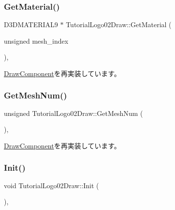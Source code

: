 \subsubsection{\texorpdfstring{Get\+Material()}{GetMaterial()}}
{\footnotesize\ttfamily D3\+D\+M\+A\+T\+E\+R\+I\+A\+L9 $\ast$ Tutorial\+Logo02\+Draw\+::\+Get\+Material (\begin{DoxyParamCaption}\item[{unsigned}]{mesh\+\_\+index }\end{DoxyParamCaption})\hspace{0.3cm}{\ttfamily [override]}, {\ttfamily [virtual]}}



\mbox{\hyperlink{class_draw_component_adae078d5139f691997763bf6cac9e25a}{Draw\+Component}}を再実装しています。

\mbox{\label{class_tutorial_logo02_draw_aadb36d767f9cca619453885dacdff836}} 
\subsubsection{\texorpdfstring{Get\+Mesh\+Num()}{GetMeshNum()}}
{\footnotesize\ttfamily unsigned Tutorial\+Logo02\+Draw\+::\+Get\+Mesh\+Num (\begin{DoxyParamCaption}{ }\end{DoxyParamCaption})\hspace{0.3cm}{\ttfamily [override]}, {\ttfamily [virtual]}}



\mbox{\hyperlink{class_draw_component_a5f3bbcc8e563b740c0a5535170921c75}{Draw\+Component}}を再実装しています。

\mbox{\label{class_tutorial_logo02_draw_abc431ab08655c42960659da325d34f13}} 
\subsubsection{\texorpdfstring{Init()}{Init()}}
{\footnotesize\ttfamily void Tutorial\+Logo02\+Draw\+::\+Init (\begin{DoxyParamCaption}{ }\end{DoxyParamCaption})\hspace{0.3cm}{\ttfamily [override]}, {\ttfamily [virtual]}}



